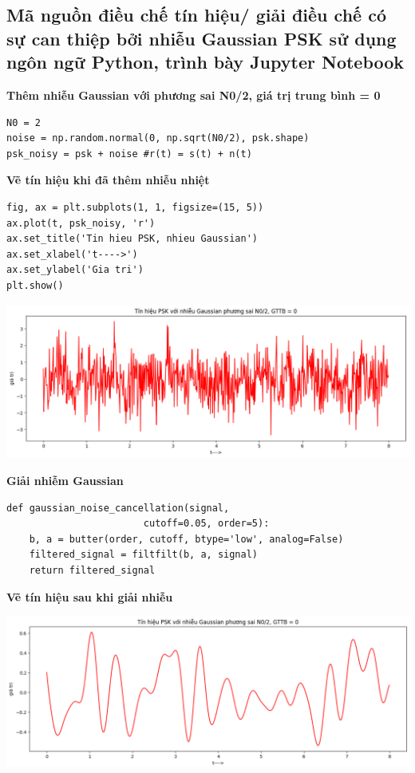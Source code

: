 {{\subsection{Mã nguồn điều chế tín hiệu/ giải điều chế có sự can thiệp bởi nhiễu Gaussian PSK sử dụng ngôn ngữ Python, trình bày Jupyter Notebook }
\textbf{Thêm nhiễu Gaussian với phương sai N0/2, giá trị trung bình = 0}
\begin{lstlisting}
N0 = 2
noise = np.random.normal(0, np.sqrt(N0/2), psk.shape)          
psk_noisy = psk + noise #r(t) = s(t) + n(t)                    
\end{lstlisting}
\textbf{Vẽ tín hiệu khi đã thêm nhiễu nhiệt}
\begin{lstlisting}
fig, ax = plt.subplots(1, 1, figsize=(15, 5))
ax.plot(t, psk_noisy, 'r')
ax.set_title('Tin hieu PSK, nhieu Gaussian')
ax.set_xlabel('t---->')
ax.set_ylabel('Gia tri')
plt.show()
\end{lstlisting}
\begin{center}
     \includegraphics[scale=.5]{Img/venhieu.png}
\end{center}
\newpage
\textbf{Giải nhiễm Gaussian}
\begin{lstlisting}
def gaussian_noise_cancellation(signal, 
                        cutoff=0.05, order=5):        
    b, a = butter(order, cutoff, btype='low', analog=False)            
    filtered_signal = filtfilt(b, a, signal)                           
    return filtered_signal                                  
\end{lstlisting}
\textbf{Vẽ tín hiệu sau khi giải nhiễu}
\begin{center}
     \includegraphics[scale=.5]{Img/giainhieu.png}
\end{center}
\newpage
}}
